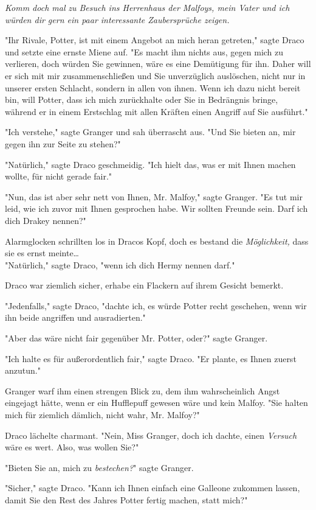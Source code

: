 {\emph{Komm doch mal} \emph{zu Besuch ins Herrenhaus der Malfoys, mein Vater und ich würden dir gern ein paar interessante Zaubersprüche zeigen.}

"Ihr Rivale, Potter, ist mit einem Angebot an mich heran getreten," sagte Draco und setzte eine ernste Miene auf. "Es macht ihm nichts aus, gegen mich zu verlieren, doch würden Sie gewinnen, wäre es eine Demütigung für ihn. Daher will er sich mit mir zusammenschließen und Sie unverzüglich auslöschen, nicht nur in unserer ersten Schlacht, sondern in allen von ihnen. Wenn ich dazu nicht bereit bin, will Potter, dass ich mich zurückhalte oder Sie in Bedrängnis bringe, während er in einem Erstschlag mit allen Kräften einen Angriff auf Sie ausführt."

"Ich verstehe," sagte Granger und sah überrascht aus. "Und Sie bieten an, mir gegen ihn zur Seite zu stehen?"

"Natürlich," sagte Draco geschmeidig. "Ich hielt das, was er mit Ihnen machen wollte, für nicht gerade fair."

"Nun, das ist aber sehr nett von Ihnen, Mr. Malfoy," sagte Granger. "Es tut mir leid, wie ich zuvor mit Ihnen gesprochen habe. Wir sollten Freunde sein. Darf ich dich Drakey nennen?"

Alarmglocken schrillten los in Dracos Kopf, doch es bestand die \emph{Möglichkeit,} dass sie es ernst meinte…\\ "Natürlich," sagte Draco, "wenn ich dich Hermy nennen darf."

Draco war ziemlich sicher, erhabe ein Flackern auf ihrem Gesicht bemerkt.

"Jedenfalls," sagte Draco, "dachte ich, es würde Potter recht geschehen, wenn wir ihn beide angriffen und ausradierten."

"Aber das wäre nicht fair gegenüber Mr. Potter, oder?" sagte Granger.

"Ich halte es für außerordentlich fair," sagte Draco. "Er plante, es Ihnen zuerst anzutun."

Granger warf ihm einen strengen Blick zu, dem ihm wahrscheinlich Angst eingejagt hätte, wenn er ein Hufflepuff gewesen wäre und kein Malfoy. "Sie halten mich für ziemlich dämlich, nicht wahr, Mr. Malfoy?"

Draco lächelte charmant. "Nein, Miss Granger, doch ich dachte, einen \emph{Versuch} wäre es wert. Also, was wollen Sie?"

"Bieten Sie an, mich zu \emph{bestechen?}" sagte Granger.

"Sicher," sagte Draco. "Kann ich Ihnen einfach eine Galleone zukommen lassen, damit Sie den Rest des Jahres Potter fertig machen, statt mich?"

}
